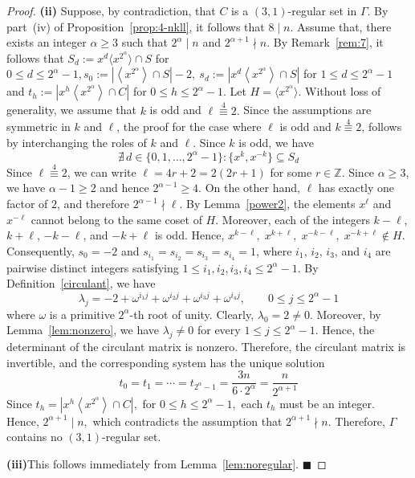 \documentclass[12pt]{article}
\begin{document}
\begin{proof}
\textbf{(ii)}
Suppose, by contradiction, that \(C\) is a \((3,1)\)-regular set in \(\Gamma\). By part~(iv) of Proposition~\ref{prop:4-nkll}, it follows that \(8\mid n\). Assume that, there exists an integer \(\alpha\ge 3\) such that
$
2^{\alpha}\mid n$
and
$2^{\alpha+1}\nmid n.$ By Remark~\ref{rem:7}, it follows that $ S_d := x^d \langle x^{2^{\alpha}} \rangle \cap S$ for $ 0 \le d \le 2^{\alpha}-1, s_0:=\left|\left\langle x^{2^{\alpha}}\right\rangle\cap S\right|-2,\ 	s_d:=\left|x^d\left\langle x^{2^{\alpha}}\right\rangle\cap S\right|$ for $ 1\le d\le 2^{\alpha}-1$ and $ t_h:=\left|x^h\left\langle x^{2^{\alpha}}\right\rangle\cap C\right|$ for $ 0\le h\le 2^{\alpha}-1.$ Let
$
H=\langle x^{2^{\alpha}}\rangle.
$ Without loss of generality, we assume that \(k\) is odd and
$
\ell\stackrel{4}{\equiv}2.$ Since the assumptions are symmetric in
\(k\) and \(\ell\), the proof for the case where \(\ell\) is odd
and $
k\stackrel{4}{\equiv}2$, follows by interchanging the roles of
\(k\) and \(\ell\). Since $k$ is odd, we have
\[
\nexists\, d\in\{0,1,\ldots,2^{\alpha}-1\} :
\{x^{k},x^{-k}\}\subseteq S_d
\]
Since $
\ell\stackrel{4}{\equiv}2$, we can write $\ell=4r+2=2(2r+1)$ for some $r\in\mathbb{Z}$. Since $\alpha\ge3$, we have $\alpha-1\ge2$ and hence $2^{\alpha-1}\ge4$. On the other hand, $\ell$ has exactly one factor of $2$, and therefore $2^{\alpha-1}\nmid\ell$. By Lemma~\ref{power2}, the elements $x^\ell$ and $x^{-\ell}$ cannot belong to the same coset of $H$. Moreover, each of the integers $k-\ell$, $k+\ell$, $-k-\ell$, and $-k+\ell$ is odd. Hence,
$
x^{k-\ell},\; x^{k+\ell},\; x^{-k-\ell},\; x^{-k+\ell}\notin H.
$
Consequently, $s_0=-2$ and $s_{i_1}=s_{i_2}=s_{i_3}=s_{i_4}=1$,
where $i_1$, $i_2$, $i_3$, and $i_4$ are pairwise distinct integers satisfying $1\le i_1,i_2,i_3,i_4\le 2^\alpha-1$.
By Definition~\ref{circulant}, we have
\[
\lambda_j=-2+\omega^{i_1j}+\omega^{i_2j}+\omega^{i_3j}+\omega^{i_4j},
\qquad 0\le j\le 2^\alpha-1
\]
where $\omega$ is a primitive $2^{\alpha}$-th root of unity. Clearly,
$
\lambda_0=2\neq0.
$ Moreover, by Lemma~\ref{lem:nonzero}, we have \(\lambda_j\neq0\) for every \(1\le j\le2^{\alpha}-1\). Hence, the determinant of the circulant matrix is nonzero. Therefore, the circulant matrix is invertible, and the corresponding system has the unique solution
\[
t_0=t_1=\cdots=t_{2^{\alpha}-1}
=\frac{3n}{6\cdot2^{\alpha}}
=\frac{n}{2^{\alpha+1}}
\]
Since
$
t_h=\left|x^h\left\langle x^{2^{\alpha}}\right\rangle\cap C\right|,$ for
$0\le h\le2^{\alpha}-1,
$
each \(t_h\) must be an integer. Hence,
$
2^{\alpha+1}\mid n,
$
which contradicts the assumption that
$
2^{\alpha+1}\nmid n.
$
Therefore, \(\Gamma\) contains no \((3,1)\)-regular set.

 \textbf{(iii)}This follows immediately from Lemma~\ref{lem:noregular}.
\hfill$\blacksquare$
 \end{proof}
 	
\end{document}
